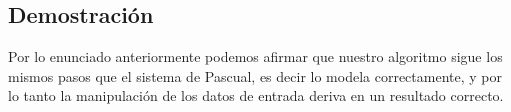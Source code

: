 \subsection{Demostraci\'on}

Por lo enunciado anteriormente podemos afirmar que nuestro algoritmo sigue los mismos pasos que el sistema de Pascual, es decir lo modela correctamente, y por lo tanto la manipulación de los datos de entrada deriva en un resultado correcto.